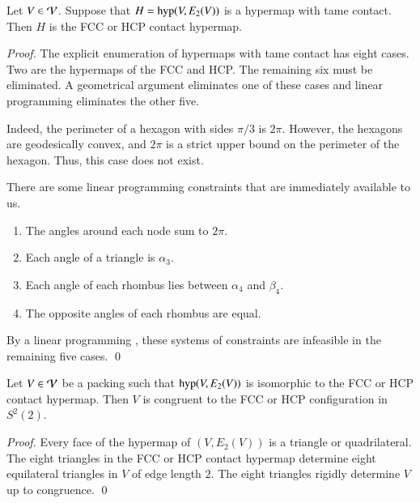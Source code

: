 \documentclass{llncs}
\def\op#1{{\hbox{#1}}}
\begin{document}
\begin{lemma}\label{lemma:fcc-ft} Let $V\in {\mathcal V}$.
  Suppose that $H=\op{hyp}(V,E_2(V))$ is a hypermap with tame
  contact.  Then $H$ is the FCC or HCP contact hypermap.
\end{lemma}

\begin{proof} The explicit enumeration of hypermaps with tame
  contact has eight cases.  Two are the hypermaps of the
  FCC and HCP.  The remaining six must be eliminated.  
A geometrical argument  eliminates one of these cases and linear programming
eliminates the other five.

  Indeed, the perimeter of a hexagon with sides $\pi/3$
is $2\pi$.  However, the hexagons are geodesically convex,
 and $2\pi$ is a strict upper bound on the perimeter of the
hexagon.  Thus, this case does not exist.

\figCXFENOK %


There are some linear
  programming constraints that are immediately available to us.
\begin{enumerate}\wasitemize 
\item The angles around each node sum to $2\pi$.
\item Each angle of a triangle is $\alpha_3$.
\item Each angle of each rhombus lies between $\alpha_4$ and $\beta_4$.
\item The opposite angles of each rhombus are equal.
\end{enumerate}\wasitemize 
By a linear programming ,
these systems of constraints are infeasible in the remaining five cases.
\qed\end{proof}


\begin{lemma}\label{lemma:kiss-fcc}
  Let $V\in {\mathcal V}$ be a packing such that $\op{hyp}(V,E_2(V))$ is
  isomorphic to the FCC or HCP contact hypermap.  Then $V$ is
  congruent to the FCC or HCP configuration in $S^2(2)$.
\end{lemma}
%
%
%
%

\begin{proof} Every face of the hypermap of $(V,E_2(V))$ is a
  triangle or quadrilateral.  The eight triangles in the FCC or HCP
  contact hypermap determine eight equilateral triangles in $V$ of
  edge length $2$.  The eight triangles rigidly determine $V$ up to
  congruence.
\qed\end{proof}
\end{document}

